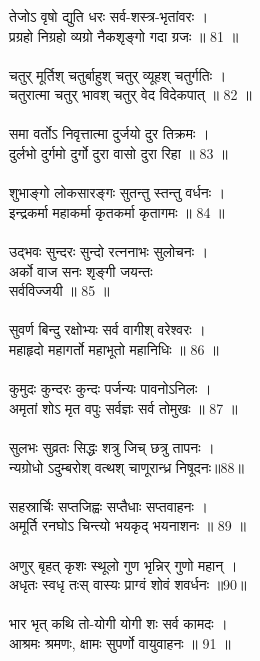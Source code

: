 \subsubsection{}
तेजोऽ वृषो द्युति धरः सर्व-शस्त्र-भृतांवरः ।\\
प्रग्रहो निग्रहो व्यग्रो नैकशृङ्गो गदा ग्रजः ॥ 81 ॥\\
\\
चतुर् मूर्तिश् चतुर्बाहुश् चतुर् व्यूहश् चतुर्गतिः ।\\
चतुरात्मा चतुर् भावश् चतुर् वेद विदेकपात् ॥ 82 ॥\\
\\
समा वर्तोऽ निवृत्तात्मा दुर्जयो दुर तिक्रमः ।\\
दुर्लभो दुर्गमो दुर्गो दुरा वासो दुरा रिहा ॥ 83 ॥\\
\\
शुभाङ्गो लोकसारङ्गः सुतन्तु स्तन्तु वर्धनः ।\\
इन्द्रकर्मा महाकर्मा कृतकर्मा कृतागमः ॥ 84 ॥\\
\\
उद्भवः सुन्दरः सुन्दो रत्ननाभः सुलोचनः ।\\
अर्को वाज सनः शृङ्गी जयन्तः\\
 सर्वविज्जयी ॥ 85 ॥\\
\\
सुवर्ण बिन्दु रक्षोभ्यः सर्व वागीश् वरेश्वरः ।\\
महाहृदो महागर्तो महाभूतो महानिधिः ॥ 86 ॥\\
\\
कुमुदः कुन्दरः कुन्दः पर्जन्यः पावनोऽनिलः ।\\
अमृतां शोऽ मृत वपुः सर्वज्ञः सर्व तोमुखः ॥ 87 ॥\\
\\
सुलभः सुव्रतः सिद्धः शत्रु जिच् छत्रु तापनः ।\\
न्यग्रोधो ऽदुम्बरोश् वत्थश् चाणूरान्ध्र निषूदनः॥88॥\\
\\
सहस्रार्चिः सप्तजिह्वः सप्तैधाः सप्तवाहनः ।\\
अमूर्ति रनघोऽ चिन्त्यो भयकृद् भयनाशनः ॥ 89 ॥\\
\\
अणुर् बृहत् कृशः स्थूलो गुण भृन्निर् गुणो महान् ।\\
अधृतः स्वधृ तःस् वास्यः प्राग्वं शोवं शवर्धनः ॥90॥\\
\\
भार भृत् कथि तो-योगी योगी शः सर्व कामदः ।\\
आश्रमः श्रमणः, क्षामः सुपर्णो वायुवाहनः ॥ 91 ॥\\
